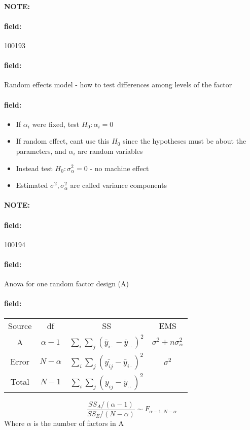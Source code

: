 \documentclass[12pt]{article}
\newenvironment{note}{\paragraph{NOTE:}}{}
\newenvironment{field}{\paragraph{field:}}{}
\begin{document}
\begin{note}
    \begin{field}
        \tiny 100193
    \end{field}
    \begin{field}
        Random effects model - how to test differences among levels of the factor
    \end{field}
    \begin{field}
        \begin{itemize}
          \item If $\alpha_i$ were fixed, test $H_0: \alpha_i = 0$
          \item If random effect, cant use this $H_0$ since the hypotheses must be about the parameters, and $\alpha_i$ are random variables
          \item Instead test $H_0: \sigma_\alpha^2 = 0$ - no machine effect
          \item Estimated $\sigma^2, \sigma_\alpha^2$ are called variance components
        \end{itemize}
    \end{field}
\end{note}

\begin{note}
    \begin{field}
        \tiny 100194
    \end{field}
    \begin{field}
        Anova for one random factor design (A)
    \end{field}
    \begin{field}
        \begin{tabular}{c c c c }
          Source & df & SS & EMS\\
          A & $\alpha-1$ & $\sum_i \sum_j(\bar{y}_{i\cdot} - \bar{y}_{\cdot\cdot})^2$ & $\sigma^2 + n\sigma_\alpha^2$\\
          Error & $N - \alpha$ & $\sum_i\sum_j (\bar{y_{ij}} - \bar{y}_{i\cdot})^2$ & $\sigma^2$\\
          Total & $N-1$ & $\sum_i\sum_j (\bar{y}_{ij} - \bar{y}_{\cdot\cdot})^2$ &
        \end{tabular}
        $$ \frac{SS_A/(\alpha-1)}{SS_E/(N-\alpha)} \sim F_{\alpha-1,N-\alpha}$$
        Where $\alpha$ is the number of factors in A

    \end{field}
\end{note}

\end{document}
